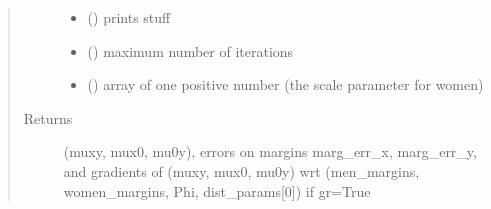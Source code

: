 \documentclass[letterpaper,10pt,english]{sphinxmanual}
\begin{document}
\begin{fulllineitems}
\begin{quote}
\begin{description}
\begin{itemize}
\item {} 
 () \textendash{} prints stuff

\item {} 
 () \textendash{} maximum number of iterations

\item {} 
 () \textendash{} array of one positive number (the scale parameter for women)

\end{itemize}

\item[{Returns}] \leavevmode
(muxy, mux0, mu0y), errors on margins marg\_err\_x, marg\_err\_y,
and gradients of (muxy, mux0, mu0y)
wrt (men\_margins, women\_margins, Phi, dist\_params{[}0{]}) if gr=True

\end{description}\end{quote}

\end{fulllineitems}

\end{document}

